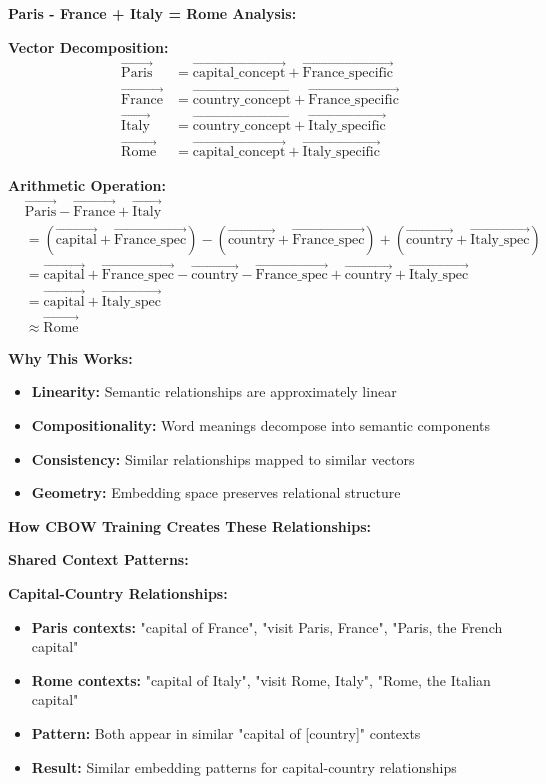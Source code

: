 \documentclass[12pt]{article}
\begin{document}
\begin{enumerate}[(a)]
{    \textbf{Paris - France + Italy = Rome Analysis:}
    
    \textbf{Vector Decomposition:}
    \begin{align}
    \vec{\text{Paris}} &= \vec{\text{capital\_concept}} + \vec{\text{France\_specific}} \\
    \vec{\text{France}} &= \vec{\text{country\_concept}} + \vec{\text{France\_specific}} \\
    \vec{\text{Italy}} &= \vec{\text{country\_concept}} + \vec{\text{Italy\_specific}} \\
    \vec{\text{Rome}} &= \vec{\text{capital\_concept}} + \vec{\text{Italy\_specific}}
    \end{align}
    
    \textbf{Arithmetic Operation:}
    \begin{align}
    &\vec{\text{Paris}} - \vec{\text{France}} + \vec{\text{Italy}} \\
    &= (\vec{\text{capital}} + \vec{\text{France\_spec}}) - (\vec{\text{country}} + \vec{\text{France\_spec}}) + (\vec{\text{country}} + \vec{\text{Italy\_spec}}) \\
    &= \vec{\text{capital}} + \vec{\text{France\_spec}} - \vec{\text{country}} - \vec{\text{France\_spec}} + \vec{\text{country}} + \vec{\text{Italy\_spec}} \\
    &= \vec{\text{capital}} + \vec{\text{Italy\_spec}} \\
    &\approx \vec{\text{Rome}}
    \end{align}
    
    \textbf{Why This Works:}
    \begin{itemize}
        \item \textbf{Linearity:} Semantic relationships are approximately linear
        \item \textbf{Compositionality:} Word meanings decompose into semantic components
        \item \textbf{Consistency:} Similar relationships mapped to similar vectors
        \item \textbf{Geometry:} Embedding space preserves relational structure
    \end{itemize}
    
    \textbf{How CBOW Training Creates These Relationships:}
    
    \textbf{Shared Context Patterns:}
    
    \textbf{Capital-Country Relationships:}
    \begin{itemize}
        \item \textbf{Paris contexts:} "capital of France", "visit Paris, France", "Paris, the French capital"
        \item \textbf{Rome contexts:} "capital of Italy", "visit Rome, Italy", "Rome, the Italian capital"
        \item \textbf{Pattern:} Both appear in similar "capital of [country]" contexts
        \item \textbf{Result:} Similar embedding patterns for capital-country relationships
    \end{itemize}
    
}
\end{enumerate}
\end{document}
